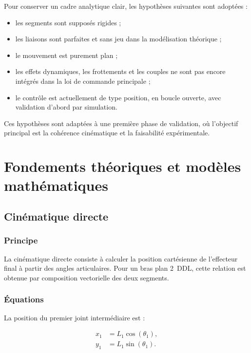 \documentclass[12pt,a4paper]{report}
\newcommand{\Lone}{L_1}
\newcommand{\thone}{\theta_1}
\newcommand{\ddof}{2~DDL}
\begin{document}
Pour conserver un cadre analytique clair, les hypothèses suivantes sont adoptées :

\begin{itemize}
    \item les segments sont supposés rigides ;
    \item les liaisons sont parfaites et sans jeu dans la modélisation théorique ;
    \item le mouvement est purement plan ;
    \item les effets dynamiques, les frottements et les couples ne sont pas encore intégrés dans la loi de commande principale ;
    \item le contrôle est actuellement de type position, en boucle ouverte, avec validation d'abord par simulation.
\end{itemize}

Ces hypothèses sont adaptées à une première phase de validation, où l'objectif
principal est la cohérence cinématique et la faisabilité expérimentale.

\chapter{Fondements théoriques et modèles mathématiques}\label{chap:theorie}

\section{Cinématique directe}

\subsection{Principe}

La cinématique directe consiste à calculer la position cartésienne de l'effecteur final
à partir des angles articulaires. Pour un bras plan \ddof, cette relation est obtenue
par composition vectorielle des deux segments.

\subsection{Équations}

La position du premier joint intermédiaire est :

\begin{align}
    x_1 &= \Lone \cos(\thone), \\
    y_1 &= \Lone \sin(\thone).
\end{align}
\end{document}
